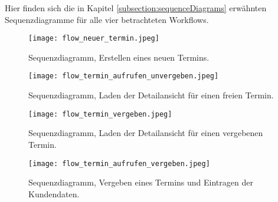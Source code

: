 Hier finden sich die in Kapitel \ref{subsection:sequenceDiagrams} erwähnten Sequenzdiagramme für alle vier betrachteten Workflows.

\begin{figure}[H]
    \caption{Sequenzdiagramm, Erstellen eines neuen Termins.}
    \centering
    \texttt{[image: flow\_neuer\_termin.jpeg]}
\end{figure}

\begin{figure}[H]
    \caption{Sequenzdiagramm, Laden der Detailansicht für einen freien Termin.}
    \centering
    \texttt{[image: flow\_termin\_aufrufen\_unvergeben.jpeg]}
\end{figure}

\begin{figure}[H]
    \caption{Sequenzdiagramm, Laden der Detailansicht für einen vergebenen Termin.}
    \centering
    \texttt{[image: flow\_termin\_vergeben.jpeg]}
\end{figure}

\begin{figure}[H]
    \caption{Sequenzdiagramm, Vergeben eines Termins und Eintragen der Kundendaten.}
    \centering
    \texttt{[image: flow\_termin\_aufrufen\_vergeben.jpeg]}
\end{figure}

